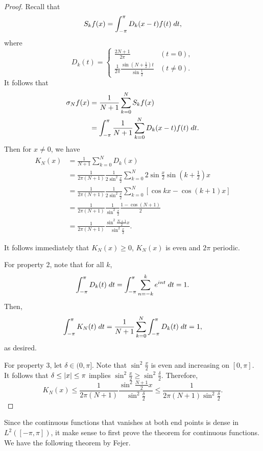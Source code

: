 \documentclass[a4paper]{article}
\begin{document}
\begin{proof}
Recall that 
\[
S_k f(x) = \int_{-\pi}^\pi D_k(x - t) f(t) \; d t,
\]
where 
\[
D_k(t) = \begin{cases}
  \frac{2 N + 1}{2 \pi} & (t = 0), \\
  \frac{1}{2\pi} \frac{\sin (N + \frac{1}{2})t}{\sin \frac{t}{2}}
  & (t \neq 0).
\end{cases}
\]
It follows that 
\[
\begin{aligned}
  \sigma_N f(x) 
  &= \frac{1}{N+1} \sum_{k=0}^N S_k f(x) \\ 
  &= \int_{-\pi}^\pi \frac{1}{N+1} \sum_{k=0}^N D_k(x - t) f(t) \; d t. 
\end{aligned}
\]
Then for $x \neq 0$, we have 
\[
\begin{aligned}
  K_N(x)
  &= \frac{1}{N+1} \sum_{k=0}^N D_k(x) \\
  &= \frac{1}{2\pi (N+1)} \frac{1}{2 \sin^2 \frac{x}{2}} 
  \sum_{k=0}^N 2 \sin \frac{x}{2} \sin \left( k + \frac{1}{2} \right) x \\
  &= \frac{1}{2\pi (N+1)} \frac{1}{2 \sin^2 \frac{x}{2}} 
  \sum_{k=0}^N \left[ \cos k x - \cos(k + 1) x \right] \\ 
  &= \frac{1}{2\pi (N + 1)} \frac{1}{\sin^2 \frac{x}{2}} 
  \frac{1 - \cos(N + 1)}{2} \\
  &= \frac{1}{2\pi (N+1)} \frac{\sin^2 \frac{N+1}{2} x}{\sin^2 
  \frac{x}{2}}.
\end{aligned}
\]

It follows immediately that $K_N(x) \geq 0$, $K_N(x)$ 
is even and $2\pi$ periodic. 

For property 2, 
note that for all $k$,
\[
\int_{-\pi}^\pi D_k(t) \; d t 
= \int_{-\pi}^\pi \sum_{n=-k}^k e^{i n t} \; d t
= 1.
\]
Then, 
\[
\int_{-\pi}^\pi K_N(t) \; d t 
= \frac{1}{N+1} \sum_{k=0}^N \int_{-\pi}^\pi D_k(t) \; d t 
= 1,
\]
as desired.

For property 3, let $\delta \in (0, \pi]$. Note that 
$\sin^2 \frac{x}{2}$ is even and increasing on 
$[0, \pi]$. It follows that $\delta \leq \left\lvert x\right\rvert \leq \pi$
implies $\sin^2 \frac{x}{2} \geq \sin^2 \frac{\delta}{2}$. 
Therefore,
\[
K_N(x) \leq \frac{1}{2\pi (N+1)} \frac{\sin^2 \frac{N+1}{2}x}
{\sin^2 \frac{\delta}{2}} 
\leq \frac{1}{2 \pi (N+1) \sin^2 \frac{\delta}{2}}.
\]
\end{proof}

Since the continuous functions that vanishes at both end 
points is dense in $L^2([-\pi, \pi])$, it make sense 
to first prove the theorem for continuous functions.
We have the following theorem by Fejer.
\end{document}
